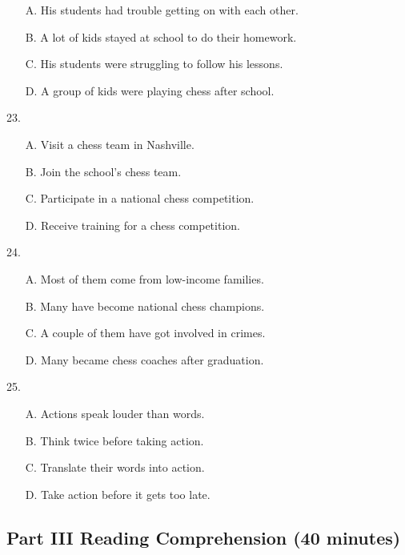\documentclass[UTF8,11pt]{ctexart}
\begin{document}
\begin{itemize}[leftmargin=2em,itemsep=.2em,topsep=.4em]\item[A.] His students had trouble getting on with each other.
\item[B.] A lot of kids stayed at school to do their homework.
\end{itemize}

\begin{itemize}[leftmargin=2em,itemsep=.2em,topsep=.4em]\item[C.] His students were struggling to follow his lessons.
\item[D.] A group of kids were playing chess after school.
\end{itemize}

23.


\begin{itemize}[leftmargin=2em,itemsep=.2em,topsep=.4em]\item[A.] Visit a chess team in Nashville.
\item[B.] Join the school’s chess team.
\item[C.] Participate in a national chess competition.
\item[D.] Receive training for a chess competition.
\end{itemize}

24.


\begin{itemize}[leftmargin=2em,itemsep=.2em,topsep=.4em]\item[A.] Most of them come from low-income families.
\item[B.] Many have become national chess champions.
\item[C.] A couple of them have got involved in crimes.
\item[D.] Many became chess coaches after graduation.
\end{itemize}

25.


\begin{itemize}[leftmargin=2em,itemsep=.2em,topsep=.4em]\item[A.] Actions speak louder than words.
\item[B.] Think twice before taking action.
\item[C.] Translate their words into action.
\item[D.] Take action before it gets too late.
\end{itemize}

\subsection*{\textbf{Part III} \textbf{Reading Comprehension} \textbf{(40 minutes)}}
\end{document}
